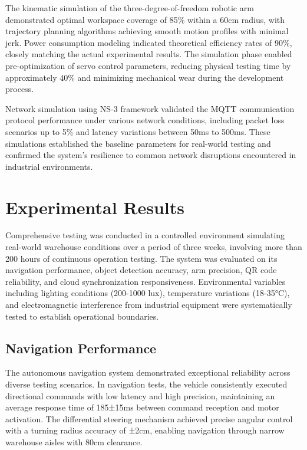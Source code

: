 The kinematic simulation of the three-degree-of-freedom robotic arm demonstrated optimal workspace coverage of 85\% within a 60cm radius, with trajectory planning algorithms achieving smooth motion profiles with minimal jerk. Power consumption modeling indicated theoretical efficiency rates of 90\%, closely matching the actual experimental results. The simulation phase enabled pre-optimization of servo control parameters, reducing physical testing time by approximately 40\% and minimizing mechanical wear during the development process.

Network simulation using NS-3 framework validated the MQTT communication protocol performance under various network conditions, including packet loss scenarios up to 5\% and latency variations between 50ms to 500ms. These simulations established the baseline parameters for real-world testing and confirmed the system's resilience to common network disruptions encountered in industrial environments.

\section{Experimental Results}

Comprehensive testing was conducted in a controlled environment simulating real-world warehouse conditions over a period of three weeks, involving more than 200 hours of continuous operation testing. The system was evaluated on its navigation performance, object detection accuracy, arm precision, QR code reliability, and cloud synchronization responsiveness. Environmental variables including lighting conditions (200-1000 lux), temperature variations (18-35°C), and electromagnetic interference from industrial equipment were systematically tested to establish operational boundaries.

\subsection{Navigation Performance}

The autonomous navigation system demonstrated exceptional reliability across diverse testing scenarios. In navigation tests, the vehicle consistently executed directional commands with low latency and high precision, maintaining an average response time of 185±15ms between command reception and motor activation. The differential steering mechanism achieved precise angular control with a turning radius accuracy of ±2cm, enabling navigation through narrow warehouse aisles with 80cm clearance.

